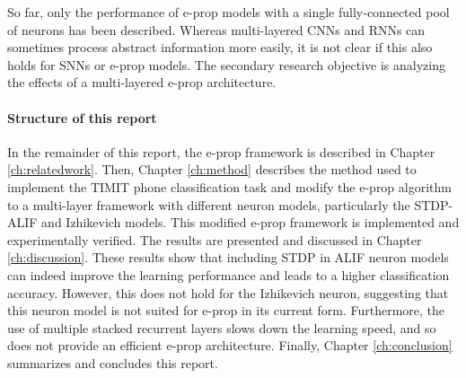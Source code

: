 	So far, only the performance of e-prop models with a single fully-connected pool of neurons has been described.
	Whereas multi-layered CNNs and RNNs can sometimes process abstract information more easily, it is not clear if this also holds for SNNs or e-prop models.
	The secondary research objective is analyzing the effects of a multi-layered e-prop architecture.

\paragraph{Structure of this report}
	In the remainder of this report, the e-prop framework is described in Chapter \ref{ch:relatedwork}.
	Then, Chapter \ref{ch:method} describes the method used to implement the TIMIT phone classification task and modify the e-prop algorithm to a multi-layer framework with different neuron models, particularly the STDP-ALIF and Izhikevich models.
	This modified e-prop framework is implemented and experimentally verified.
	The results are presented and discussed in Chapter \ref{ch:discussion}.
	These results show that including STDP in ALIF neuron models can indeed improve the learning performance and leads to a higher classification accuracy.
	However, this does not hold for the Izhikevich neuron, suggesting that this neuron model is not suited for e-prop in its current form.
	Furthermore, the use of multiple stacked recurrent layers slows down the learning speed, and so does not provide an efficient e-prop architecture.
	Finally, Chapter \ref{ch:conclusion} summarizes and concludes this report.

